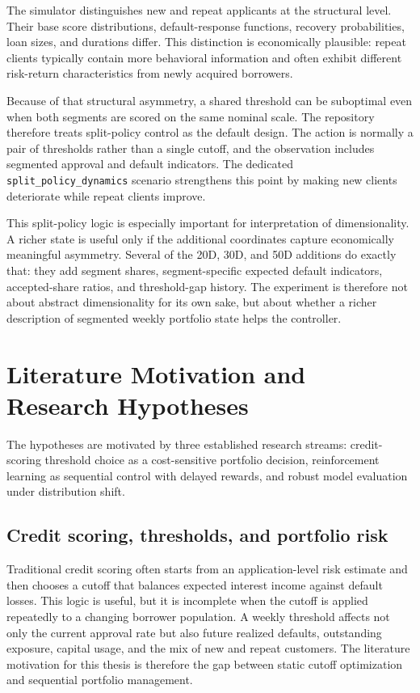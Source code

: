 \documentclass[12pt,a4paper]{article}
\begin{document}
The simulator distinguishes new and repeat applicants at the structural level. Their base score distributions, default-response functions, recovery probabilities, loan sizes, and durations differ. This distinction is economically plausible: repeat clients typically contain more behavioral information and often exhibit different risk-return characteristics from newly acquired borrowers.

Because of that structural asymmetry, a shared threshold can be suboptimal even when both segments are scored on the same nominal scale. The repository therefore treats split-policy control as the default design. The action is normally a pair of thresholds rather than a single cutoff, and the observation includes segmented approval and default indicators. The dedicated \texttt{split\_policy\_dynamics} scenario strengthens this point by making new clients deteriorate while repeat clients improve.

This split-policy logic is especially important for interpretation of dimensionality. A richer state is useful only if the additional coordinates capture economically meaningful asymmetry. Several of the 20D, 30D, and 50D additions do exactly that: they add segment shares, segment-specific expected default indicators, accepted-share ratios, and threshold-gap history. The experiment is therefore not about abstract dimensionality for its own sake, but about whether a richer description of segmented weekly portfolio state helps the controller.

\section{Literature Motivation and Research Hypotheses}

The hypotheses are motivated by three established research streams: credit-scoring threshold choice as a cost-sensitive portfolio decision, reinforcement learning as sequential control with delayed rewards, and robust model evaluation under distribution shift.

\subsection{Credit scoring, thresholds, and portfolio risk}

Traditional credit scoring often starts from an application-level risk estimate and then chooses a cutoff that balances expected interest income against default losses. This logic is useful, but it is incomplete when the cutoff is applied repeatedly to a changing borrower population. A weekly threshold affects not only the current approval rate but also future realized defaults, outstanding exposure, capital usage, and the mix of new and repeat customers. The literature motivation for this thesis is therefore the gap between static cutoff optimization and sequential portfolio management.
\end{document}
